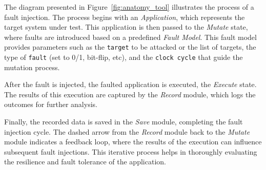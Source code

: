 The diagram presented in Figure~\ref{fig:anatomy_tool} illustrates the process of a fault injection. The process begins with an \textit{Application}, which represents the target system under test. This application is then passed to the \textit{Mutate} state, where faults are introduced based on a predefined \textit{Fault Model}. 
This fault model provides parameters such as the \texttt{target} to be attacked or the list of targets, the type of \texttt{fault} (set to 0/1, bit-flip, etc), and the \texttt{clock cycle} that guide the mutation process.

After the fault is injected, the faulted application is executed, the \textit{Execute} state. The results of this execution are captured by the \textit{Record} module, which logs the outcomes for further analysis.

Finally, the recorded data is saved in the \textit{Save} module, completing the fault injection cycle. The dashed arrow from the \textit{Record} module back to the \textit{Mutate} module indicates a feedback loop, where the results of the execution can influence subsequent fault injections. This iterative process helps in thoroughly evaluating the resilience and fault tolerance of the application.



